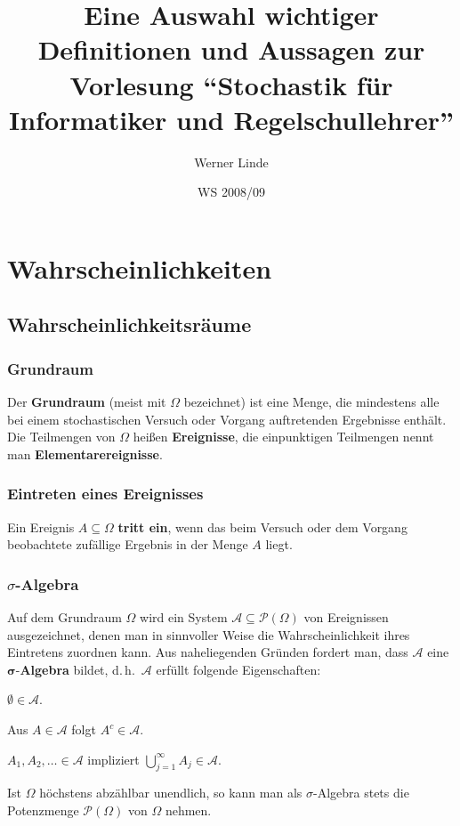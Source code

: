 \documentclass[ngerman,draft,parskip=half,twoside]{scrartcl}
\newcommand*{\Algeb}{\mathcal{A}}   %
\newcommand*{\PotM}{\mathcal{P}}    %
\begin{document}
\title{Eine Auswahl wichtiger Definitionen und Aussagen
 zur Vorlesung
  \enquote{Stochastik für Informatiker und Regelschullehrer}}
\date{WS 2008/09}
\author{Werner Linde}
\maketitle

\section{Wahrscheinlichkeiten}
\subsection{Wahrscheinlichkeitsräume}

\subsubsection{Grundraum}
Der \textbf{Grundraum} (meist mit $\Omega$ bezeichnet) ist eine Menge,
die mindestens alle bei einem stochastischen Versuch oder Vorgang
auftretenden Ergebnisse enthält. Die Teilmengen von $\Omega$ heißen \textbf{Ereignisse},
die einpunktigen Teilmengen nennt man \textbf{Elementarereignisse}.

\subsubsection{Eintreten eines Ereignisses}
Ein Ereignis $A\subseteq \Omega$ \textbf{tritt ein}, wenn das beim Versuch oder dem Vorgang
beobachtete zufällige Ergebnis in der Menge
$A$ liegt.

\subsubsection{$\sigma$-Algebra}
Auf dem Grundraum $\Omega$ wird ein System $\Algeb\subseteq \PotM(\Omega)$  von Ereignissen
ausgezeichnet, denen man in sinnvoller Weise die
Wahrscheinlichkeit ihres Eintretens zuordnen kann. Aus naheliegenden Gründen fordert man,
dass $\Algeb$ eine $\mathbf \sigma$-\textbf{Algebra} bildet, d.\,h.~$\Algeb$ erfüllt
folgende Eigenschaften:
\begin{eigenschaften}
 \item $\emptyset\in\Algeb$.
 \item Aus $A\in\Algeb$ folgt $A^c\in \Algeb$.
 \item $A_1,A_2,\ldots\in \Algeb$ impliziert $\bigcup_{j=1}^\infty A_j\in\Algeb$.
\end{eigenschaften}
Ist $\Omega$ höchstens abzählbar unendlich, so kann man als $\sigma$-Algebra stets die
Potenzmenge $\PotM(\Omega)$ von $\Omega$ nehmen.
\end{document}
